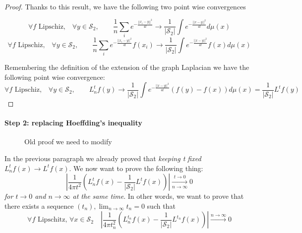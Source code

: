 \begin{proof}
Thanks to this result, we have the following two point wise convergences

$$\forall f \text{ Lipschiz,}\quad \forall y\in\mathcal S_2,  \quad\quad \frac{1}{n}\sum_i e^{-\frac{||x_i-y||^2}{4t}}\rightarrow \frac{1}{|\mathcal S_2|}\int e^{-\frac{||x-y||^2}{4t}}d\mu(x)$$
$$\forall f \text{ Lipschiz,}\quad \forall y\in\mathcal S_2,  \quad\quad \frac{1}{n}\sum_i e^{-\frac{||x_i-y||^2}{4t}}f(x_i)\rightarrow \frac{1}{|\mathcal S_2|}\int e^{-\frac{||x-y||^2}{4t}}f(x)d\mu(x)$$

Remembering the definition of the extension of the graph Laplacian we have the following point wise convergence:
$$\forall f \text{ Lipschiz,}\quad \forall y\in\mathcal S_2,  \quad\quad L_n^tf(y)\rightarrow \frac{1}{|\mathcal S_2|}\int e^{-\frac{||x-y||^2}{4t}}\left(f(y)-f(x)\right)d\mu(x) = \frac{1}{|\mathcal S_2|} L^tf(y)$$
\end{proof}
\paragraph{Step 2: replacing Hoeffding's inequality}
\begin{figure}[h!]
	\label{fig:Belkin proof}
	\caption{Old proof we need to modify}
	\centering
\end{figure}
In the previous paragraph we already proved that \textit{keeping t fixed} $L_n^tf(x)\rightarrow L^tf(x)$. We now want to prove the following thing:
$$\left|\frac{1}{4\pi t^2}\left(L_n^tf(x) - \frac{1}{|\mathcal S_2|}L^tf(x)\right)\right|\xrightarrow[n\to \infty]{t\to 0}0$$
\textit{for $t\to0$ and $n\to\infty$ at the same time}. In other words, we want to prove that there exists a sequence $(t_n), \lim_{n\to\infty}t_n=0$ such that 
$$\forall f \text{ Lipschitz, } \forall x\in\mathcal S_2 \quad \left|\frac{1}{4\pi t_n^2}\left(L_n^{t_n}f(x) -\frac{1}{|\mathcal S_2|} L^{t_n}f(x)\right)\right|\xrightarrow{n\to \infty}0$$

